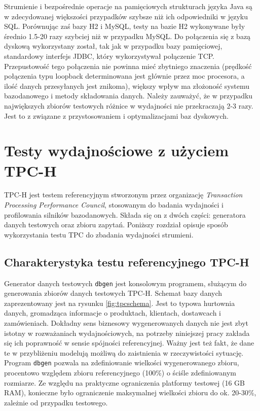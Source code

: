 \documentclass[12pt,twoside,openright]{extarticle}
\begin{document}
    Strumienie i bezpośrednie operacje na pamięciowych strukturach języka Java są w zdecydowanej większości przypadków szybsze niż ich odpowiedniki w języku SQL. Porównując zaś bazy H2 i MySQL, testy na bazie H2 wykonywane były średnio 1.5-20 razy szybciej niż w przypadku MySQL.  Do połączenia się z bazą dyskową wykorzystany został, tak jak w przypadku bazy pamięciowej, standardowy interfejs JDBC, który wykorzystywał połączenie TCP. Przepustowość tego połączenia nie powinna mieć zbytniego znaczenia (prędkość połączenia typu loopback determinowana jest głównie przez moc procesora, a ilość danych przesyłanych jest znikoma), większy wpływ ma złożoność systemu bazodanowego i metody składowania danych. Należy zauważyć, że w przypadku największych zbiorów testowych różnice w wydajności nie przekraczają 2-3 razy. Jest to z związane z przystosowaniem i optymalizacjami baz dyskowych.


\cleardoublepage
\section{Testy wydajnościowe z użyciem TPC-H} \label{tpc}

    TPC-H jest testem referencyjnym stworzonym przez organizację \textit{Transaction Processing Performance Council}, stosowanym do badania wydajności i profilowania silników bazodanowych. Składa się on z dwóch części: generatora danych testowych oraz zbioru zapytań. Poniższy rozdział opisuje sposób wykorzystania testu TPC do zbadania wydajności strumieni.

\subsection{Charakterystyka testu referencyjnego TPC-H}

    Generator danych testowych \texttt{dbgen} jest konsolowym programem, służącym do generowania zbiorów danych testowych TPC-H. Schemat bazy danych zaprezentowany jest na rysunku \ref{fig:tpcschema}. Jest to typowa hurtownia danych, gromadząca informacje o produktach, klientach, dostawcach i zamówieniach. Dokładny sens biznesowy wygenerowanych danych nie jest zbyt istotny w rozważaniach wydajnościowych, na potrzeby niniejszej pracy zakłada się ich poprawność w sensie spójności referencyjnej. Ważny jest też fakt, że dane te w przybliżeniu modelują możliwą do zaistnienia w rzeczywistości sytuację. Program \texttt{dbgen} pozwala na zdefiniowanie wielkości wygenerowanego zbioru, procentowo względem zbioru referencyjnego (100\%) o ściśle zdefiniowanym rozmiarze. Ze względu na praktyczne ograniczenia platformy testowej (16 GB RAM), konieczne było ograniczenie maksymalnej wielkości zbioru do ok. 20-30\%, zależnie od przypadku testowego. 
\end{document}
